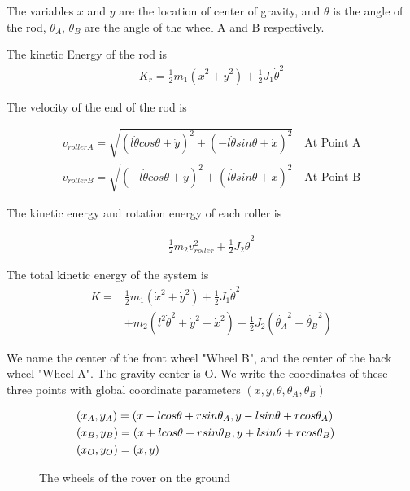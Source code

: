 The variables $x$ and $y$ are the location of center of gravity, and $\theta$ is the angle of the rod, $\theta_A$, $\theta_B$ are the angle of the wheel A and B respectively.


The kinetic Energy of the rod is 
\begin{eqnarray}
K_r=\frac{1}{2}m_1(\dot{x}^2+\dot{y}^2)+\frac{1}{2}J_1\dot{\theta}^2
\end{eqnarray}


The velocity of the end of the rod is

\begin{eqnarray}
&v_{rollerA}=\sqrt{(l\dot{\theta}cos\theta+\dot{y})^2+(-l\dot{\theta}sin\theta+\dot{x})^2} \quad \text{At Point A}&\\
&v_{rollerB}=\sqrt{(-l\dot{\theta}cos\theta+\dot{y})^2+(l\dot{\theta}sin\theta+\dot{x})^2} \quad \text{At Point B}&
\end{eqnarray}

The kinetic energy and rotation energy of each roller is

\begin{eqnarray}
\frac{1}{2}m_2v_{roller}^2+\frac{1}{2}J_2\dot{\theta}^2
\end{eqnarray}

The total kinetic energy of the system is
\begin{equation}
\begin{aligned}
K=&\frac{1}{2}m_1(\dot{x}^2+\dot{y}^2)+\frac{1}{2}J_1\dot{\theta}^2\\
&+m_2(l^2\dot{\theta}^2+\dot{y}^2
+\dot{x}^2)+\frac{1}{2}J_2(\dot{\theta_A}^2+\dot{\theta_B}^2)
\label{k1}
\end{aligned}
\end{equation}

We name the center of the front wheel "Wheel B", and the center of the back wheel "Wheel A". The gravity center is O. We write the coordinates of these three points with global coordinate parameters $(x,y,\theta,\theta_A,\theta_B)$

\begin{eqnarray}
&(x_A,y_A)=(x-lcos\theta+rsin\theta_A,y-lsin\theta+rcos\theta_A)& \notag \\
&(x_B,y_B)=(x+lcos\theta+rsin\theta_B,y+lsin\theta+rcos\theta_B)& \notag \\
&(x_O,y_O)=(x,y)& \notag 
\end{eqnarray}

\begin{figure}[htbp]
\begin{center}
 
\caption{The wheels of the rover  on the ground}
\label{figure:sdd}
\end{center}
\end{figure}

